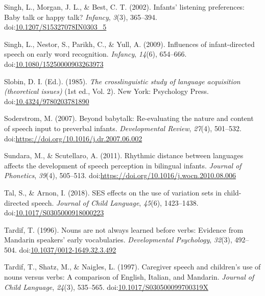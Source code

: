 \documentclass[,man,floatsintext]{apa6}
\begin{document}
\leavevmode\hypertarget{ref-singh_2002}{}%
Singh, L., Morgan, J. L., \& Best, C. T. (2002). Infants' listening preferences: Baby talk or happy talk? \emph{Infancy}, \emph{3}(3), 365--394. doi:\href{https://doi.org/10.1207/S15327078IN0303_5}{10.1207/S15327078IN0303\_5}

\leavevmode\hypertarget{ref-singh_2009}{}%
Singh, L., Nestor, S., Parikh, C., \& Yull, A. (2009). Influences of infant-directed speech on early word recognition. \emph{Infancy}, \emph{14}(6), 654--666. doi:\href{https://doi.org/10.1080/15250000903263973}{10.1080/15250000903263973}

\leavevmode\hypertarget{ref-slobin_1985}{}%
Slobin, D. I. (Ed.). (1985). \emph{The crosslinguistic study of language acquisition (theoretical issues)} (1st ed., Vol. 2). New York: Psychology Press. doi:\href{https://doi.org/10.4324/9780203781890}{10.4324/9780203781890}

\leavevmode\hypertarget{ref-soderstrom_2007}{}%
Soderstrom, M. (2007). Beyond babytalk: Re-evaluating the nature and content of speech input to preverbal infants. \emph{Developmental Review}, \emph{27}(4), 501--532. doi:\href{https://doi.org/https://doi.org/10.1016/j.dr.2007.06.002}{https://doi.org/10.1016/j.dr.2007.06.002}

\leavevmode\hypertarget{ref-sundara_2011}{}%
Sundara, M., \& Scutellaro, A. (2011). Rhythmic distance between languages affects the development of speech perception in bilingual infants. \emph{Journal of Phonetics}, \emph{39}(4), 505--513. doi:\href{https://doi.org/https://doi.org/10.1016/j.wocn.2010.08.006}{https://doi.org/10.1016/j.wocn.2010.08.006}

\leavevmode\hypertarget{ref-tal_2018}{}%
Tal, S., \& Arnon, I. (2018). SES effects on the use of variation sets in child-directed speech. \emph{Journal of Child Language}, \emph{45}(6), 1423--1438. doi:\href{https://doi.org/10.1017/S0305000918000223}{10.1017/S0305000918000223}

\leavevmode\hypertarget{ref-tardif_1996}{}%
Tardif, T. (1996). Nouns are not always learned before verbs: Evidence from Mandarin speakers' early vocabularies. \emph{Developmental Psychology}, \emph{32}(3), 492--504. doi:\href{https://doi.org/10.1037/0012-1649.32.3.492}{10.1037/0012-1649.32.3.492}

\leavevmode\hypertarget{ref-tardif_1997}{}%
Tardif, T., Shatz, M., \& Naigles, L. (1997). Caregiver speech and children's use of nouns versus verbs: A comparison of English, Italian, and Mandarin. \emph{Journal of Child Language}, \emph{24}(3), 535--565. doi:\href{https://doi.org/10.1017/S030500099700319X}{10.1017/S030500099700319X}
\end{document}
